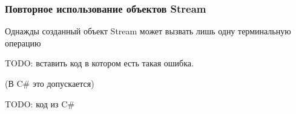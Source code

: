 \begin{frame}
\frametitle{Повторное использование объектов Stream} %
Однажды созданный объект Stream может вызвать лишь одну терминальную операцию

TODO: вставить код в котором есть такая ошибка.

(В C\# это допускается)

TODO: код из C\#
\end{frame}